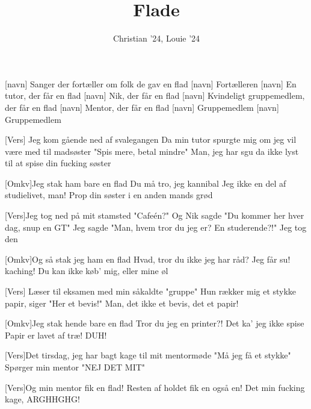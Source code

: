 \documentclass[a4paper,11pt]{article}
\title{Flade}
\author{Christian '24, Louie '24}
\begin{document}
\maketitle

\begin{roles}
[navn] Sanger der fortæller om folk de gav en flad
[navn] Fortælleren
[navn] En tutor, der får en flad 
[navn] Nik, der får en flad
[navn] Kvindeligt gruppemedlem, der får en flad
[navn] Mentor, der får en flad
[navn] Gruppemedlem
[navn] Gruppemedlem
\end{roles}

\begin{song}
  [Vers] Jeg kom gående ned af svalegangen
Da min tutor spurgte mig om jeg vil være med til madsøster
"Spis mere, betal mindre"
Man, jeg har sgu da ikke lyst til at spise din fucking søster

    [Omkv]Jeg stak ham bare en flad
Du må tro, jeg kannibal
Jeg ikke en del af studielivet, man!
Prop din søster i en anden mands grød

    [Vers]Jeg tog ned på mit stamsted "Cafeén?"
Og Nik sagde "Du kommer her hver dag, snup en GT"
Jeg sagde "Man, hvem tror du jeg er? En studerende?!"
Jeg tog den

    [Omkv]Og så stak jeg ham en flad
Hvad, tror du ikke jeg har råd?
Jeg får su! kaching!
Du kan ikke køb' mig, eller mine øl

    [Vers] Læser til eksamen med min såkaldte "gruppe"
Hun rækker mig et stykke papir, siger "Her et bevis!"
Man, det ikke et bevis, det et papir!

    [Omkv]Jeg stak hende bare en flad
Tror du jeg en printer?!
Det ka' jeg ikke spise
Papir er lavet af træ! DUH!

    [Vers]Det tirsdag, jeg har bagt kage til mit mentormøde
"Må jeg få et stykke"\hspace{0pt} Spørger min mentor "NEJ DET MIT"

    [Vers]Og min mentor fik en flad!
Resten af holdet fik en også en!
Det min fucking kage, ARGHHGHG!

    
\end{song}
\end{document}
